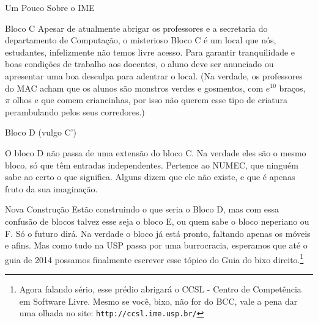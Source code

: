 \begin{secao}{Um Pouco Sobre o IME}
\begin{subsecao}{Bloco C}
Apesar de atualmente abrigar os professores e a secretaria do departamento de
Computação, o misterioso Bloco C é um local que nós, estudantes, infelizmente não
temos livre acesso. Para garantir tranquilidade e boas condições de trabalho aos
docentes, o aluno deve ser anunciado ou apresentar uma boa desculpa para adentrar
o local. (Na verdade, os professores do MAC acham que os alunos são monstros
verdes e gosmentos, com $e^{10}$ braços, $\pi$ olhos e que comem criancinhas,
por isso não querem esse tipo de criatura perambulando pelos seus corredores.)

\end{subsecao}

\begin{subsecao}{Bloco D (vulgo C')}

O bloco D não passa de uma extensão do bloco C. Na verdade eles são o mesmo bloco,
só que têm entradas independentes. Pertence ao NUMEC, que ninguém sabe ao certo
o que significa. Alguns dizem que ele não existe, e que é apenas fruto da sua
imaginação.

\end{subsecao}

\begin{subsecao}{Nova Construção}
Estão construindo o que seria o Bloco D, mas com essa confusão de blocos talvez
esse seja o bloco E, ou quem sabe o bloco neperiano ou F. Só o futuro dirá. Na
verdade o bloco já está pronto, faltando apenas os móveis e afins. Mas como tudo
na USP passa por uma burrocracia, esperamos que até o guia de 2014 possamos
finalmente escrever esse tópico do Guia do bixo direito.\footnote{Agora falando
sério, esse prédio abrigará o CCSL - Centro de Competência em Software Livre.
Mesmo se você, bixo, não for do BCC, vale a pena dar uma olhada no site:
{\tt http://ccsl.ime.usp.br/}}

\end{subsecao}
\end{secao}
